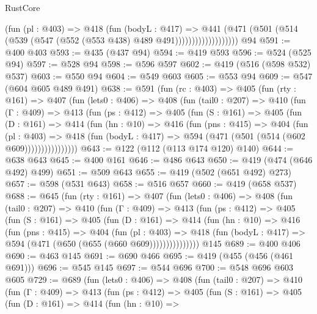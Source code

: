 \begin{lexlean}{RustCore}
\begin{coremodule}
{\begin{coremodule}
{{{{{                          (fun (pl : @403) =>
                          @418
                            (fun (bodyL : @417) =>
                            @441
                              (@471
                                (@501
                                  (@514 (@539 (@547 (@552 (@553 @438) @489 @491)))))))))))))))))))
    @94
@591 := @400 @403
@593 := @435 (@437 @94)
@594 := @419 @593
@596 := @524 (@525 @94)
@597 := @528 @94
@598 := @596 @597
@602 := @419 (@516 (@598 @532) @537)
@603 := @550 @94
@604 := @549 @603
@605 := @553 @94
@609 := @547 (@604 @605 @489 @491)
@638 := @591
    (fun (rc : @403) =>
    @405
      (fun (rty : @161) =>
      @407
        (fun (lets0 : @406) =>
        @408
          (fun (tail0 : @207) =>
          @410
            (fun (Γ : @409) =>
            @413
              (fun (ps : @412) =>
              @405
                (fun (S : @161) =>
                @405
                  (fun (D : @161) =>
                  @414
                    (fun (hn : @10) =>
                    @416
                      (fun (pns : @415) =>
                      @404
                        (fun (pl : @403) =>
                        @418
                          (fun (bodyL : @417) => @594 (@471 (@501 (@514 (@602 @609))))))))))))))))
@643 := @122 (@112 (@113 @174 @120) @140)
@644 := @638 @643
@645 := @400 @161
@646 := @486 @643
@650 := @419 (@474 (@646 @492) @499)
@651 := @509 @643
@655 := @419 (@502 (@651 @492) @273)
@657 := @598 (@531 @643)
@658 := @516 @657
@660 := @419 (@658 @537)
@688 := @645
    (fun (rty : @161) =>
    @407
      (fun (lets0 : @406) =>
      @408
        (fun (tail0 : @207) =>
        @410
          (fun (Γ : @409) =>
          @413
            (fun (ps : @412) =>
            @405
              (fun (S : @161) =>
              @405
                (fun (D : @161) =>
                @414
                  (fun (hn : @10) =>
                  @416
                    (fun (pns : @415) =>
                    @404
                      (fun (pl : @403) =>
                      @418 (fun (bodyL : @417) => @594 (@471 (@650 (@655 (@660 @609)))))))))))))))
    @145
@689 := @400 @406
@690 := @463 @145
@691 := @690 @466
@695 := @419 (@455 (@456 (@461 @691)))
@696 := @545 @145
@697 := @544 @696
@700 := @548 @696 @603 @605
@729 := @689
    (fun (lets0 : @406) =>
    @408
      (fun (tail0 : @207) =>
      @410
        (fun (Γ : @409) =>
        @413
          (fun (ps : @412) =>
          @405
            (fun (S : @161) =>
            @405
              (fun (D : @161) =>
              @414
                (fun (hn : @10) =>
}}}}}
\end{coremodule}}
\end{coremodule}
\end{lexlean}
